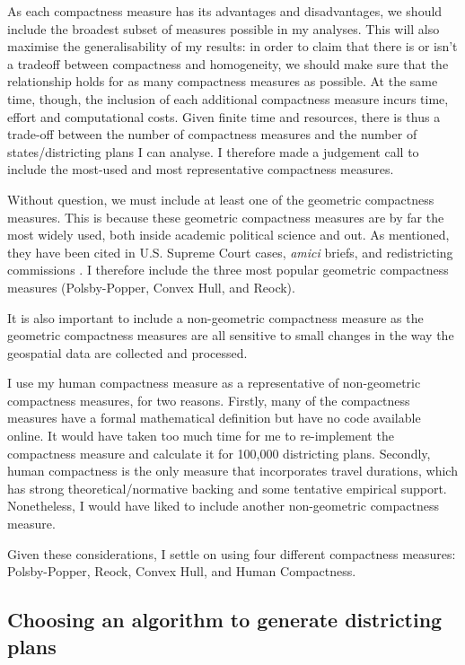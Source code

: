 \documentclass[]{article}
\begin{document}
As each compactness measure has its advantages and disadvantages, we
should include the broadest subset of measures possible in my analyses.
This will also maximise the generalisability of my results: in order to
claim that there is or isn't a tradeoff between compactness and
homogeneity, we should make sure that the relationship holds for as many
compactness measures as possible. At the same time, though, the
inclusion of each additional compactness measure incurs time, effort and
computational costs. Given finite time and resources, there is thus a
trade-off between the number of compactness measures and the number of
states/districting plans I can analyse. I therefore made a judgement
call to include the most-used and most representative compactness
measures.

Without question, we must include at least one of the geometric
compactness measures. This is because these geometric compactness
measures are by far the most widely used, both inside academic political
science and out. As mentioned, they have been cited in U.S. Supreme
Court cases, \emph{amici} briefs, and redistricting commissions
\citep{moncrief2011}. I therefore include the three most popular
geometric compactness measures (Polsby-Popper, Convex Hull, and Reock).

It is also important to include a non-geometric compactness measure as
the geometric compactness measures are all sensitive to small changes in
the way the geospatial data are collected and processed.

I use my human compactness measure as a representative of non-geometric
compactness measures, for two reasons. Firstly, many of the compactness
measures have a formal mathematical definition but have no code
available online. It would have taken too much time for me to
re-implement the compactness measure and calculate it for 100,000
districting plans. Secondly, human compactness is the only measure that
incorporates travel durations, which has strong theoretical/normative
backing and some tentative empirical support. Nonetheless, I would have
liked to include another non-geometric compactness measure.

Given these considerations, I settle on using four different compactness
measures: Polsby-Popper, Reock, Convex Hull, and Human Compactness.

\hypertarget{choosing-an-algorithm-to-generate-districting-plans}{%
\subsection{Choosing an algorithm to generate districting
plans}\label{choosing-an-algorithm-to-generate-districting-plans}}
\end{document}
